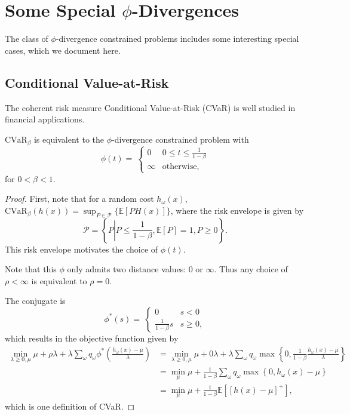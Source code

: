 \documentclass[ijoc,nonblindrev]{informs3} %
\newcommand{\E}{\mathbb{E}}
\newcommand{\e}[1]{\E \left[ #1 \right]}
\begin{document}
\section{Some Special $\phi$-Divergences}
\label{sec:special_phi}

The class of $\phi$-divergence constrained problems includes some interesting special cases, which we document here.

\subsection{Conditional Value-at-Risk}

The coherent risk measure Conditional Value-at-Risk (CVaR) is well studied in financial applications.
\begin{theorem} \label{thm:cvar}
	$\text{CVaR}_\beta$ is equivalent to the $\phi$-divergence constrained problem with 
	\[
		\phi(t) = \
		\begin{cases}
			0 & 0 \leq t \leq \frac{1}{1-\beta} \\
			\infty & \text{otherwise},
		\end{cases}
	\]
	for $0 < \beta < 1$.
\end{theorem}

\begin{proof}
	First, note that for a random cost $h_\omega(x)$, $\mbox{CVaR}_\beta(h(x)) = \sup_{P \in \mathcal{P}} \{\e{PH(x)}\}$, where the risk envelope is given by
	\[
		\mathcal{P} = \left\{ P \left| P \leq \frac{1}{1-\beta}, \e{P} = 1, P \geq 0 \right.\right\}.
	\]
	This risk envelope motivates the choice of $\phi(t)$.
	
	Note that this $\phi$ only admits two distance values: $0$ or $\infty$.
	Thus any choice of $\rho < \infty$ is equivalent to $\rho = 0$.
	
	The conjugate is
	\[
	\phi^*(s) = \
		\begin{cases}
			0 & s < 0 \\
			\frac{1}{1-\beta} s & s \geq 0,
		\end{cases}
	\]
	which results in the objective function given by
	\begin{align*}
		\min_{\lambda \geq 0,\mu} \mu + \rho \lambda + \lambda \sum_\omega q_\omega \phi^*\left( \frac{h_\omega(x)-\mu}{\lambda} \right) & = \min_{\lambda \geq 0, \mu} \mu + 0\lambda + \lambda \sum_\omega q_\omega \max\left\{ 0, \frac{1}{1-\beta} \frac{h_\omega(x)-\mu}{\lambda} \right\} \\
		& = \min_{\mu} \mu + \frac{1}{1-\beta} \sum_\omega q_\omega \max\left\{ 0, h_\omega(x)-\mu \right\} \\
		& = \min_{\mu} \mu + \frac{1}{1-\beta} \e{[h(x)-\mu]^+},
	\end{align*}
	which is one definition of CVaR.
\end{proof}
\end{document}
